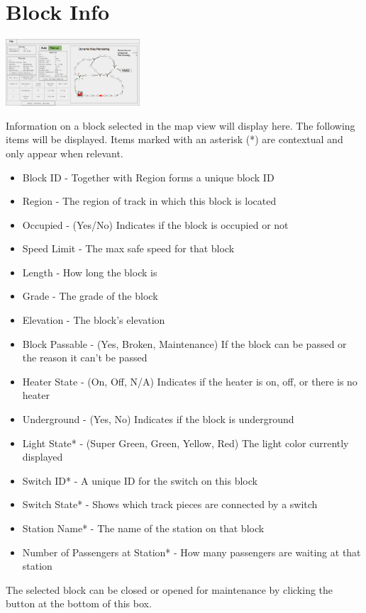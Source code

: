 \documentclass{scrreprt}
\begin{document}
\section{Block Info}
\begin{center}
  \includegraphics[trim={8.75cm 6.7cm 19.2cm 3.2cm},clip,width=5cm]{CTC-main}
\end{center}
Information on a block selected in the map view will display here. The following items 
will be displayed. Items marked with an asterisk (*) are contextual and only appear when 
relevant. 
\begin{itemize}
  \item Block ID - Together with Region forms a unique block ID
  \item Region - The region of track in which this block is located
  \item Occupied - (Yes/No) Indicates if the block is occupied or not
  \item Speed Limit - The max safe speed for that block
  \item Length - How long the block is
  \item Grade - The grade of the block
  \item Elevation - The block's elevation
  \item Block Passable - (Yes, Broken, Maintenance) If the block can be passed or the reason 
  it can't be passed
  \item Heater State - (On, Off, N/A) Indicates if the heater is on, off, or there is no heater
  \item Underground - (Yes, No) Indicates if the block is underground
  \item Light State* - (Super Green, Green, Yellow, Red) The light color currently displayed
  \item Switch ID* - A unique ID for the switch on this block
  \item Switch State* - Shows which track pieces are connected by a switch
  \item Station Name* - The name of the station on that block
  \item Number of Passengers at Station* - How many passengers are waiting at that station
\end{itemize}
The selected block can be closed or opened for maintenance by clicking the button at the 
bottom of this box.
\end{document}
